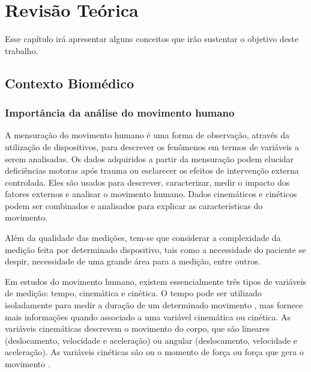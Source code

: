 
\chapter[Revisão Teórica]{Revisão Teórica}
  Esse capítulo irá apresentar alguns conceitos que irão sustentar o objetivo deste trabalho.
\section{Contexto Biomédico}
\subsection{Importância da análise do movimento humano}

A mensuração do movimento humano é uma forma de observação, através da utilização 
de dispositivos, para descrever os fenômenos em termos de variáveis a serem analisadas. 
Os dados adquiridos a partir da mensuração podem elucidar deficiências 
motoras após trauma ou esclarecer os efeitos de intervenção externa controlada.
Eles são usados para descrever, caracterizar, medir o impacto dos
fatores externos e analisar o movimento humano. Dados cinemáticos e cinéticos podem ser combinados
e analisados para explicar as características do movimento. 

Além da qualidade das medições, tem-se que considerar a complexidade da medição
feita por determinado dispositivo, tais como a necessidade do paciente se despir,
necessidade de uma grande área para a medição, entre outros.

Em estudos do movimento humano, existem essencialmente três tipos de variáveis de medição: tempo,
cinemática e cinética. O tempo pode ser utilizado isoladamente para medir a duração de um determinado movimento
, mas fornece mais informações quando associado a uma variável cinemática ou cinética.
As variáveis cinemáticas descrevem o movimento do corpo, que são lineares (deslocamento,
velocidade e aceleração) ou angular (deslocamento, velocidade e aceleração).
 As variáveis cinéticas são ou o momento de força ou força que gera o movimento \cite{roberto}.

